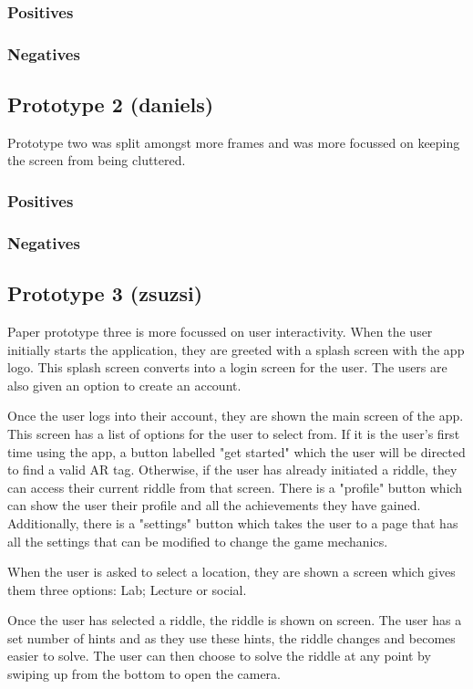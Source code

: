 \documentclass[a4,10pt,twocolumn]{article}
\begin{document}
\subsubsection*{Positives}
\subsubsection*{Negatives}

\subsection*{Prototype 2 (daniels)}
Prototype two was split amongst more frames and was more focussed on keeping the screen from being cluttered. 

\subsubsection*{Positives}
\subsubsection*{Negatives}

\subsection*{Prototype 3 (zsuzsi)}
Paper prototype three is more focussed on user interactivity. When the user initially starts the application, they are greeted with a splash screen with the app logo. This splash screen converts into a login screen for the user. The users are also given an option to create an account.

Once the user logs into their account, they are shown the main screen of the app. This screen has a list of options for the user to select from. If it is the user's first time using the app, a button labelled "get started" which the user will be directed to find a valid AR tag. Otherwise, if the user has already initiated a riddle, they can access their current riddle from that screen. There is a "profile" button which can show the user their profile and all the achievements they have gained. Additionally, there is a "settings" button which takes the user to a page that has all the settings that can be modified to change the game mechanics.

When the user is asked to select a location, they are shown a screen which gives them three options: Lab; Lecture or social.

Once the user has selected a riddle, the riddle is shown on screen. The user has a set number of hints and as they use these hints, the riddle changes and becomes easier to solve. The user can then choose to solve the riddle at any point by swiping up from the bottom to open the camera. 
\end{document}
